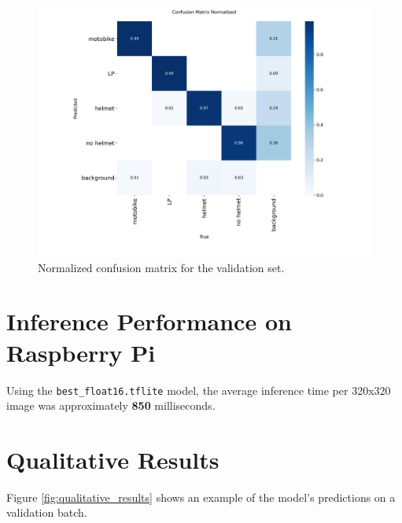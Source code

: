 \begin{figure}[H]
    \centering
    \includegraphics[width=1\textwidth]{../runs/detect/helmet_detection/confusion_matrix_normalized.png}
    \caption{Normalized confusion matrix for the validation set.}
    \label{fig:confusion_matrix}
\end{figure}

\section{Inference Performance on Raspberry Pi}
Using the \texttt{best\_float16.tflite} model, the average inference time per 320x320 image was approximately \textbf{850} milliseconds.

\section{Qualitative Results}
Figure \ref{fig:qualitative_results} shows an example of the model's predictions on a validation batch.

